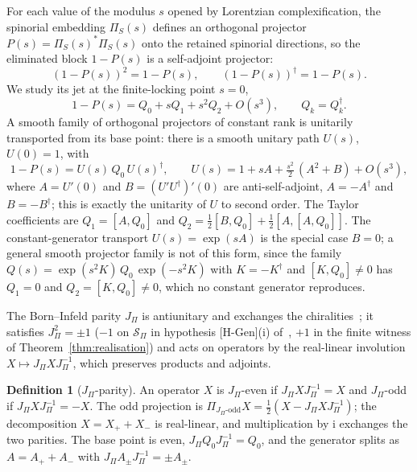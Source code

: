 \documentclass[11pt]{article}
\theoremstyle{definition}
\newtheorem{definition}{Definition}
\theoremstyle{remark}
\newcommand{\JPi}{J_{\Pi}}
\newcommand{\PiS}{\Pi_{S}}
\newcommand{\Podd}{\Pi_{\JPi\text{-odd}}}
\begin{document}
    For each value of the modulus $s$ opened by Lorentzian complexification, the spinorial embedding $\PiS(s)$
    defines an orthogonal projector $P(s) = \PiS(s)^{*}\PiS(s)$ onto the retained spinorial directions, so the
    eliminated
    block $1 - P(s)$ is a self-adjoint projector:
    \begin{equation}
      \label{eq:projector}
      (1-P(s))^2 = 1 - P(s),
      \qquad (1-P(s))^{\dagger} = 1 - P(s).
    \end{equation}
    We study its jet at the finite-locking point $s = 0$,
    \begin{equation}
      \label{eq:jet}
      1 - P(s) = Q_0 + s Q_1 + s^2 Q_2 + O(s^3),
      \qquad Q_k = Q_k^{\dagger}.
    \end{equation}
    A smooth family of orthogonal projectors of constant rank is unitarily transported from its base point: there is a
    smooth unitary path $U(s)$, $U(0) = 1$, with
    \begin{equation}
      \label{eq:conjugation}
      1 - P(s) = U(s)\,Q_0\,U(s)^{\dagger},
      \qquad U(s) = 1 + sA + \tfrac{s^2}{2}\,(A^2 + B) + O(s^3),
    \end{equation}
    where $A = U'(0)$ and $B = (U' U^{\dagger})'(0)$ are anti-self-adjoint, $A = -A^{\dagger}$ and $B = -B^{\dagger}$;
    this is exactly the unitarity of $U$ to second order.
    The Taylor coefficients are $Q_1 = [A, Q_0]$ and $Q_2 = \tfrac12 [B, Q_0] + \tfrac12 [A, [A, Q_0]]$.
    The constant-generator transport $U(s) = \exp(sA)$ is the special case $B = 0$; a general smooth projector family
    is not of this form, since the family $Q(s) = \exp(s^2 K)\,Q_0\,\exp(-s^2 K)$ with $K = -K^{\dagger}$ and $[K, Q_0]
    \neq 0$ has $Q_1 = 0$
    and
    $Q_2 = [K, Q_0] \neq 0$, which no constant generator reproduces.

    The Born--Infeld parity $\JPi$ is antiunitary and exchanges the chiralities~\cite{Beau2026prs, Beau2026q14}; it
    satisfies
    $\JPi^2 = \pm 1$ ($-1$ on $\mathcal{S}_\Pi$ in hypothesis [H-Gen](i) of~\cite{Beau2026prs}, $+1$ in the finite
    witness of Theorem~\ref{thm:realisation}) and acts on operators by the real-linear involution $X \mapsto \JPi X \JPi^{-1}$, which preserves
    products and adjoints.

    \begin{definition}[$\JPi$-parity]
      \label{def:parity}
      An operator $X$ is $\JPi$-even if $\JPi X \JPi^{-1} = X$ and $\JPi$-odd if $\JPi X \JPi^{-1} = -X$.
      The odd projection is $\Podd X = \tfrac12 (X - \JPi X \JPi^{-1})$; the decomposition $X = X_+ + X_-$ is
      real-linear,
      and multiplication by $\mathrm{i}$ exchanges the two parities.
      The base point is even, $\JPi Q_0 \JPi^{-1} = Q_0$, and the generator splits as $A = A_+ + A_-$ with
      $\JPi A_{\pm} \JPi^{-1} = \pm A_{\pm}$.
    \end{definition}
\end{document}
